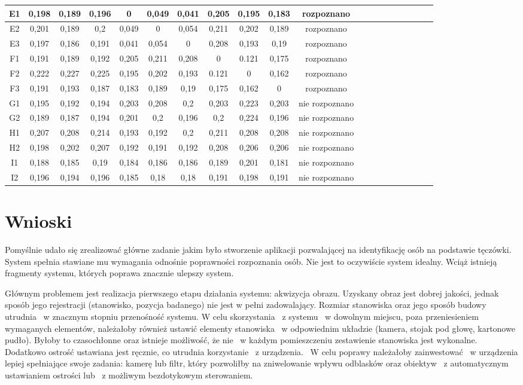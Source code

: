 \begin{table}
\begin{center}
\begin{tabular}{|c|c|c|c|c|c|c|c|c|c|c|c|c|c|c|c|c|c|c|l|}
E1 & 0,198&0,189&0,196&0&0,049&0,041&0,205&0,195&0,183 & rozpoznano\\ \hline
E2 & 0,201&0,189&0,2&0,049&0&0,054&0,211&0,202&0,189 & rozpoznano\\ \hline
E3 & 0,197&0,186&0,191&0,041&0,054&0&0,208&0,193&0,19 & rozpoznano\\ \hline
F1 & 0,191&0,189&0,192&0,205&0,211&0,208&0&0.121&0,175 & rozpoznano\\ \hline
F2 & 0,222&0,227&0,225&0,195&0,202&0,193&0.121&0&0,162 & rozpoznano\\ \hline
F3 & 0,191&0,193&0,187&0,183&0,189&0,19&0,175&0,162&0 & rozpoznano\\ \hline
G1 & 0,195&0,192&0,194&0,203&0,208&0,2&0,203&0,223&0,203 & nie rozpoznano\\ \hline
G2 & 0,189&0,187&0,194&0,201&0,2&0,196&0,2&0,224&0,196 & nie rozpoznano\\ \hline
H1 & 0,207&0,208&0,214&0,193&0,192&0,2&0,211&0,208&0,208 & nie rozpoznano\\ \hline
H2 & 0,198&0,202&0,207&0,192&0,191&0,192&0,208&0,206&0,206 & nie rozpoznano\\ \hline
I1 & 0,188&0,185&0,19&0,184&0,186&0,186&0,189&0,201&0,181 & nie rozpoznano\\ \hline
I2 & 0,196&0,194&0,196&0,185&0,18&0,18&0,191&0,198&0,191 & nie rozpoznano\\ \hline
\end{tabular}
\end{center}
\end{table}

\section{Wnioski}
\label{sec:wnioski}

Pomyślnie udało się zrealizować główne zadanie jakim było stworzenie aplikacji pozwalającej na identyfikację osób na podstawie tęczówki. System spełnia stawiane mu wymagania odnośnie poprawności rozpoznania osób. Nie jest to oczywiście system idealny. Wciąż istnieją fragmenty systemu, których poprawa znacznie ulepszy system.

Głównym problemem jest realizacja pierwszego etapu działania systemu: akwizycja obrazu. Uzyskany obraz jest dobrej jakości, jednak sposób jego  rejestracji (stanowisko, pozycja badanego) nie jest w pełni zadowalający. Rozmiar stanowiska oraz jego sposób budowy utrudnia ~w znacznym stopniu przenośność systemu. W celu skorzystania ~z systemu ~w dowolnym miejscu, poza przeniesieniem wymaganych elementów, należałoby również ustawić elementy stanowiska ~w odpowiednim układzie (kamera, stojak pod głowę, kartonowe pudło). Byłoby to czasochłonne oraz istnieje możliwość, że nie ~w każdym pomieszczeniu zestawienie stanowiska jest wykonalne. Dodatkowo ostrość ustawiana jest ręcznie, co utrudnia korzystanie ~z urządzenia. ~W celu poprawy należałoby zainwestować ~w urządzenia lepiej spełniające swoje zadania: kamerę lub filtr, który pozwoliłby na zniwelowanie wpływu odblasków oraz obiektyw ~z automatycznym ustawianiem ostrości lub ~z możliwym bezdotykowym sterowaniem.

